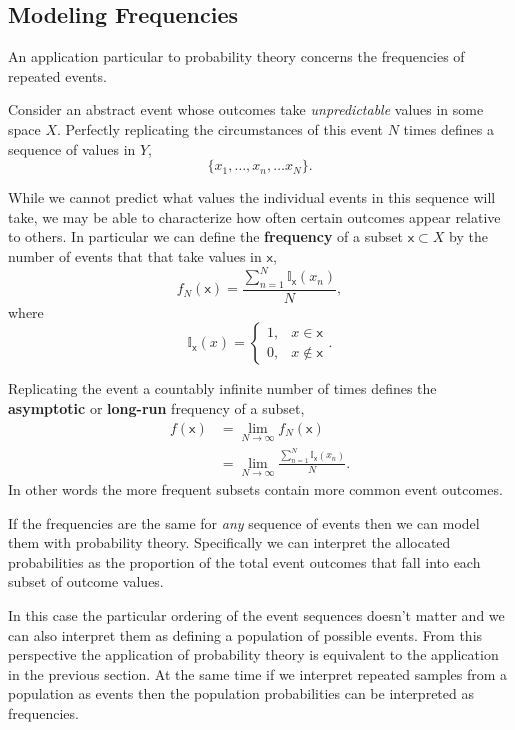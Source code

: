 \documentclass[
  letterpaper,
  DIV=11,
  numbers=noendperiod]{scrartcl}
\begin{document}
\hypertarget{modeling-frequencies}{%
\subsection{Modeling Frequencies}\label{modeling-frequencies}}

An application particular to probability theory concerns the frequencies
of repeated events.

Consider an abstract event whose outcomes take \emph{unpredictable}
values in some space \(X\). Perfectly replicating the circumstances of
this event \(N\) times defines a sequence of values in \(Y\), \[
\{ x_{1}, \ldots, x_{n}, \ldots x_{N} \}.
\]

While we cannot predict what values the individual events in this
sequence will take, we may be able to characterize how often certain
outcomes appear relative to others. In particular we can define the
\textbf{frequency} of a subset \(\mathsf{x} \subset X\) by the number of
events that that take values in \(\mathsf{x}\), \[
f_{N}(\mathsf{x})
= \frac{ \sum_{n = 1}^{N} \mathbb{I}_{\mathsf{x}}(x_{n}) }{N},
\] where \[
\mathbb{I}_{\mathsf{x}}(x)
=
\left\{
\begin{array}{rr}
1, & x \in \mathsf{x} \\
0, & x \notin \mathsf{x}
\end{array}
\right. .
\]

Replicating the event a countably infinite number of times defines the
\textbf{asymptotic} or \textbf{long-run} frequency of a subset,
\begin{align*}
f(\mathsf{x})
&=
\lim_{N \rightarrow \infty} f_{N}(\mathsf{x})
\\
&=
\lim_{N \rightarrow \infty}
\frac{ \sum_{n = 1}^{N} \mathbb{I}_{\mathsf{x}}(x_{n}) }{N}.
\end{align*} In other words the more frequent subsets contain more
common event outcomes.

If the frequencies are the same for \emph{any} sequence of events then
we can model them with probability theory. Specifically we can interpret
the allocated probabilities as the proportion of the total event
outcomes that fall into each subset of outcome values.

In this case the particular ordering of the event sequences doesn't
matter and we can also interpret them as defining a population of
possible events. From this perspective the application of probability
theory is equivalent to the application in the previous section. At the
same time if we interpret repeated samples from a population as events
then the population probabilities can be interpreted as frequencies.
\end{document}
